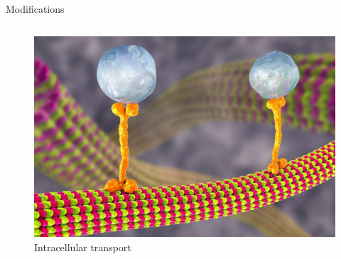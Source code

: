 \documentclass[10pt,xcolor=table, aspectratio=1610]{beamer}
\begin{document}
\begin{frame}{Modifications}
\begin{columns}
\begin{figure}
        \includegraphics[width=\textwidth]{img/kinesin.jpeg}
        \caption*{Intracellular transport}
      \end{figure}
    \end{columns}
\end{frame}
\end{document}
